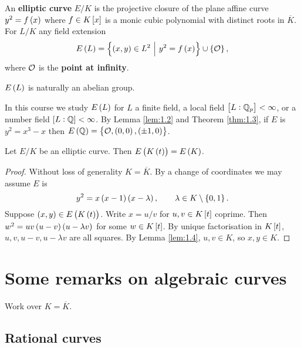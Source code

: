 \begin{definition}
\label{def:1.5}
An \textbf{elliptic curve} $ E / K $ is the projective closure of the plane affine curve $ y^2 = f\br{x} $ where $ f \in K\sbr{x} $ is a monic cubic polynomial with distinct roots in $ \overline{K} $. For $ L / K $ any field extension
$$ E\br{L} = \cbr{\br{x, y} \in L^2 \st y^2 = f\br{x}} \cup \cbr{\OOO}, $$
where $ \mathcal{O} $ is the \textbf{point at infinity}.
\end{definition}

\begin{fact*}
$ E\br{L} $ is naturally an abelian group.
\end{fact*}

In this course we study $ E\br{L} $ for $ L $ a finite field, a local field $ \sbr{L : \QQ_p} < \infty $, or a number field $ \sbr{L : \QQ} < \infty $. By Lemma \ref{lem:1.2} and Theorem \ref{thm:1.3}, if $ E $ is $ y^2 = x^3 - x $ then $ E\br{\QQ} = \cbr{\OOO, \br{0, 0}, \br{\pm 1, 0}} $.

\begin{corollary}
\label{cor:1.6}
Let $ E / K $ be an elliptic curve. Then $ E\br{K\br{t}} = E\br{K} $.
\end{corollary}

\begin{proof}
Without loss of generality $ K = \overline{K} $. By a change of coordinates we may assume $ E $ is
$$ y^2 = x\br{x - 1}\br{x - \lambda}, \qquad \lambda \in K \setminus \cbr{0, 1}. $$
Suppose $ \br{x, y} \in E\br{K\br{t}} $. Write $ x = u / v $ for $ u, v \in K\sbr{t} $ coprime. Then $ w^2 = uv\br{u - v}\br{u - \lambda v} $ for some $ w \in K\sbr{t} $. By unique factorisation in $ K\sbr{t} $, $ u, v, u - v, u - \lambda v $ are all squares. By Lemma \ref{lem:1.4}, $ u, v \in K $, so $ x, y \in K $.
\end{proof}

\pagebreak

\section{Some remarks on algebraic curves}


Work over $ K = \overline{K} $.

\subsection{Rational curves}

